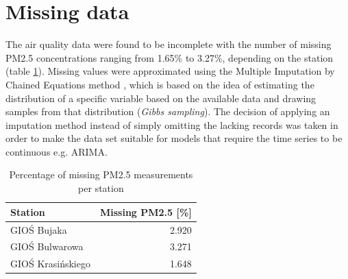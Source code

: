 \section{Missing data}
The air quality data were found to be incomplete with the number of missing PM2.5 concentrations ranging from 1.65\% to 3.27\%, depending on the station (table \ref{tab:dataset-missing-pm25}). Missing values were approximated using the Multiple Imputation by Chained Equations method \cite{MICE2011}, which is based on the idea of estimating the distribution of a specific variable based on the available data and drawing samples from that distribution (\textit{Gibbs sampling}). The decision of applying an imputation method instead of simply omitting the lacking records was taken in order to make the data set suitable for models that require the time series to be continuous e.g. ARIMA.

\begin{table}[H]
\centering
\caption{Percentage of missing PM2.5 measurements per station}
\label{tab:dataset-missing-pm25}
\begin{tabular}{lr}
\toprule
Station           & Missing PM2.5 {[}\%{]} \\ \midrule
GIOŚ Bujaka       & 2.920                  \\
GIOŚ Bulwarowa    & 3.271                  \\
GIOŚ Krasińskiego & 1.648                  \\ \bottomrule
\end{tabular}
\end{table}

